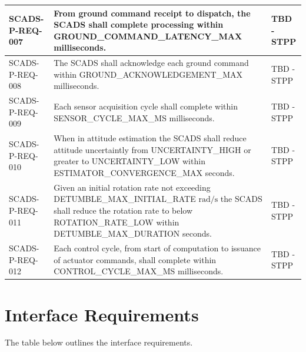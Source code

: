 \documentclass{article}
\begin{document}
\begin{longtable}{|l|p{9cm}|p{5cm}|}
                SCADS-P-REQ-007 & From ground command receipt to dispatch, the
                                  SCADS shall complete processing within 
                                  GROUND\_COMMAND\_LATENCY\_MAX milliseconds. & TBD - STPP \\ \hline
                SCADS-P-REQ-008 & The SCADS shall acknowledge each ground command
                                  within GROUND\_ACKNOWLEDGEMENT\_MAX milliseconds.
                                & TBD - STPP \\ \hline
                SCADS-P-REQ-009 & Each sensor acquisition cycle shall complete 
                                  within SENSOR\_CYCLE\_MAX\_MS milliseconds.
                                & TBD - STPP \\ \hline
                SCADS-P-REQ-010 & When in attitude estimation the SCADS shall 
                                  reduce attitude uncertaintly from 
                                  UNCERTAINTY\_HIGH or greater to 
                                  UNCERTAINTY\_LOW within 
                                  ESTIMATOR\_CONVERGENCE\_MAX seconds.
                                & TBD - STPP \\ \hline
                SCADS-P-REQ-011 & Given an initial rotation rate not exceeding 
                                  DETUMBLE\_MAX\_INITIAL\_RATE $\mathrm{rad/s}$
                                  the SCADS shall reduce the rotation rate to 
                                  below ROTATION\_RATE\_LOW within 
                                  DETUMBLE\_MAX\_DURATION seconds.
                                & TBD - STPP \\ \hline
                SCADS-P-REQ-012 & Each control cycle, from start of computation 
                                  to issuance of actuator commands, shall 
                                  complete within CONTROL\_CYCLE\_MAX\_MS 
                                  milliseconds.
                                & TBD - STPP \\ \hline
        \end{longtable}

    \section{Interface Requirements}\label{sec:interface-requirements}

        The table below outlines the interface requirements.
\end{document}
